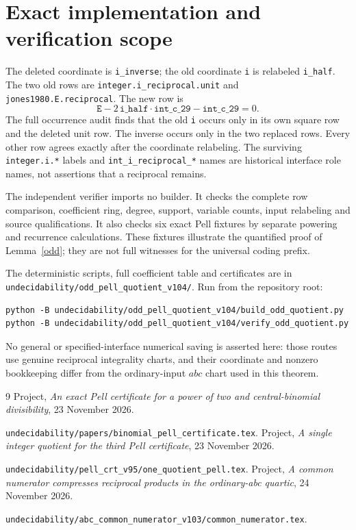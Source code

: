 \documentclass[11pt]{article}
\begin{document}
\section{Exact implementation and verification scope}

The deleted coordinate is \texttt{i\_inverse}; the old coordinate
\texttt{i} is relabeled \texttt{i\_half}. The two old rows are
\texttt{integer.i\_reciprocal.unit} and
\texttt{jones1980.E.reciprocal}. The new row is
\[
 \mathtt{E}-2\,\mathtt{i\_half}\cdot\mathtt{int\_c\_29}
                     -\mathtt{int\_c\_29}=0.
\]
The full occurrence audit finds that the old \texttt{i} occurs only
in its own square row and the deleted unit row. The inverse occurs
only in the two replaced rows. Every other row agrees exactly after
the coordinate relabeling. The surviving \texttt{integer.i.*} labels
and \texttt{int\_i\_reciprocal\_*} names are historical interface
role names, not assertions that a reciprocal remains.

The independent verifier imports no builder. It checks the complete
row comparison, coefficient ring, degree, support, variable counts,
input relabeling and source qualifications. It also checks six exact
Pell fixtures by separate powering and recurrence calculations. These
fixtures illustrate the quantified proof of Lemma~\ref{odd}; they
are not full witnesses for the universal coding prefix.

The deterministic scripts, full coefficient table and certificates
are in \nolinkurl{undecidability/odd_pell_quotient_v104/}.
Run from the repository root:
\begin{verbatim}
python -B undecidability/odd_pell_quotient_v104/build_odd_quotient.py
python -B undecidability/odd_pell_quotient_v104/verify_odd_quotient.py
\end{verbatim}

No general or specified-interface numerical saving is asserted here:
those routes use genuine reciprocal integrality charts, and their
coordinate and nonzero bookkeeping differ from the ordinary-input
\(abc\) chart used in this theorem.

\begin{thebibliography}{9}
\small
{} Project, \emph{An exact Pell certificate for a power
of two and central-binomial divisibility}, 23 November 2026.\par
\nolinkurl{undecidability/papers/binomial_pell_certificate.tex}.
 Project, \emph{A single integer quotient for the third
Pell certificate}, 23 November 2026.\par
\nolinkurl{undecidability/pell_crt_v95/one_quotient_pell.tex}.
 Project, \emph{A common numerator compresses reciprocal
products in the ordinary-abc quartic}, 24 November 2026.\par
\nolinkurl{undecidability/abc_common_numerator_v103/common_numerator.tex}.
\end{thebibliography}
\end{document}
